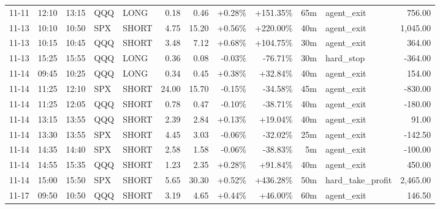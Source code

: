 \documentclass[11pt,a4paper,twoside]{article}
\begin{document}
\begin{center}
\begin{longtable}{>{\color{txtmain}}l l l l l r r r r r >{\color{txtmain}}l r}
11-11 & 12:10 & 13:15 & QQQ & LONG & 0.18 & 0.46 & \textcolor{wingreen}{+0.28\%} & \textcolor{wingreen}{+151.35\%} & 65m & agent\_exit & \textcolor{wingreen}{756.00} \\
11-13 & 10:10 & 10:50 & SPX & SHORT & 4.75 & 15.20 & \textcolor{wingreen}{+0.56\%} & \textcolor{wingreen}{+220.00\%} & 40m & agent\_exit & \textcolor{wingreen}{1,045.00} \\
11-13 & 10:15 & 10:45 & QQQ & SHORT & 3.48 & 7.12 & \textcolor{wingreen}{+0.68\%} & \textcolor{wingreen}{+104.75\%} & 30m & agent\_exit & \textcolor{wingreen}{364.00} \\
11-13 & 15:25 & 15:55 & QQQ & LONG & 0.36 & 0.08 & \textcolor{lossred}{-0.03\%} & \textcolor{lossred}{-76.71\%} & 30m & hard\_stop & \textcolor{lossred}{-364.00} \\
11-14 & 09:45 & 10:25 & QQQ & LONG & 0.34 & 0.45 & \textcolor{wingreen}{+0.38\%} & \textcolor{wingreen}{+32.84\%} & 40m & agent\_exit & \textcolor{wingreen}{154.00} \\
11-14 & 11:25 & 12:10 & SPX & SHORT & 24.00 & 15.70 & \textcolor{lossred}{-0.15\%} & \textcolor{lossred}{-34.58\%} & 45m & agent\_exit & \textcolor{lossred}{-830.00} \\
11-14 & 11:25 & 12:05 & QQQ & SHORT & 0.78 & 0.47 & \textcolor{lossred}{-0.10\%} & \textcolor{lossred}{-38.71\%} & 40m & agent\_exit & \textcolor{lossred}{-180.00} \\
11-14 & 13:15 & 13:55 & QQQ & SHORT & 2.39 & 2.84 & \textcolor{wingreen}{+0.13\%} & \textcolor{wingreen}{+19.04\%} & 40m & agent\_exit & \textcolor{wingreen}{91.00} \\
11-14 & 13:30 & 13:55 & SPX & SHORT & 4.45 & 3.03 & \textcolor{lossred}{-0.06\%} & \textcolor{lossred}{-32.02\%} & 25m & agent\_exit & \textcolor{lossred}{-142.50} \\
11-14 & 14:35 & 14:40 & SPX & SHORT & 2.58 & 1.58 & \textcolor{lossred}{-0.06\%} & \textcolor{lossred}{-38.83\%} & 5m & agent\_exit & \textcolor{lossred}{-100.00} \\
11-14 & 14:55 & 15:35 & QQQ & SHORT & 1.23 & 2.35 & \textcolor{wingreen}{+0.28\%} & \textcolor{wingreen}{+91.84\%} & 40m & agent\_exit & \textcolor{wingreen}{450.00} \\
11-14 & 15:00 & 15:50 & SPX & SHORT & 5.65 & 30.30 & \textcolor{wingreen}{+0.52\%} & \textcolor{wingreen}{+436.28\%} & 50m & hard\_take\_profit & \textcolor{wingreen}{2,465.00} \\
11-17 & 09:50 & 10:50 & QQQ & SHORT & 3.19 & 4.65 & \textcolor{wingreen}{+0.44\%} & \textcolor{wingreen}{+46.00\%} & 60m & agent\_exit & \textcolor{wingreen}{146.50} \\

\end{longtable}
\end{center}
\end{document}
